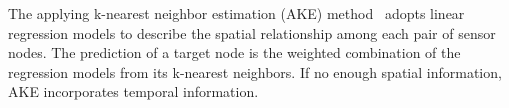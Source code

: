 


The applying k-nearest neighbor estimation (AKE) method~\cite{pan2010k}
adopts linear regression models to describe the spatial relationship among
each pair of sensor nodes. The prediction of a target node is the
weighted combination of the regression models from its k-nearest neighbors.
If no enough spatial information, AKE incorporates temporal information.

